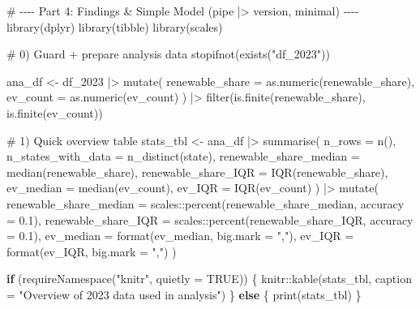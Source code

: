 \documentclass[
  english,
  letterpaper,
  DIV=11,
  numbers=noendperiod]{scrartcl}
\newenvironment{Shaded}{\begin{snugshade}}{\end{snugshade}}
\newcommand{\AttributeTok}[1]{\textcolor[rgb]{0.40,0.45,0.13}{#1}}
\newcommand{\CommentTok}[1]{\textcolor[rgb]{0.37,0.37,0.37}{#1}}
\newcommand{\ConstantTok}[1]{\textcolor[rgb]{0.56,0.35,0.01}{#1}}
\newcommand{\ControlFlowTok}[1]{\textcolor[rgb]{0.00,0.23,0.31}{\textbf{#1}}}
\newcommand{\FloatTok}[1]{\textcolor[rgb]{0.68,0.00,0.00}{#1}}
\newcommand{\FunctionTok}[1]{\textcolor[rgb]{0.28,0.35,0.67}{#1}}
\newcommand{\NormalTok}[1]{\textcolor[rgb]{0.00,0.23,0.31}{#1}}
\newcommand{\OtherTok}[1]{\textcolor[rgb]{0.00,0.23,0.31}{#1}}
\newcommand{\SpecialCharTok}[1]{\textcolor[rgb]{0.37,0.37,0.37}{#1}}
\newcommand{\StringTok}[1]{\textcolor[rgb]{0.13,0.47,0.30}{#1}}
\begin{document}
\begin{Shaded}
\begin{Highlighting}[]
\CommentTok{\# {-}{-}{-}{-} Part 4: Findings \& Simple Model (pipe |\textgreater{} version, minimal) {-}{-}{-}{-}}
\FunctionTok{library}\NormalTok{(dplyr)}
\FunctionTok{library}\NormalTok{(tibble)}
\FunctionTok{library}\NormalTok{(scales)}

\CommentTok{\# 0) Guard + prepare analysis data}
\FunctionTok{stopifnot}\NormalTok{(}\FunctionTok{exists}\NormalTok{(}\StringTok{"df\_2023"}\NormalTok{))}

\NormalTok{ana\_df }\OtherTok{\textless{}{-}}
\NormalTok{  df\_2023 }\SpecialCharTok{|\textgreater{}}
  \FunctionTok{mutate}\NormalTok{(}
    \AttributeTok{renewable\_share =} \FunctionTok{as.numeric}\NormalTok{(renewable\_share),}
    \AttributeTok{ev\_count        =} \FunctionTok{as.numeric}\NormalTok{(ev\_count)}
\NormalTok{  ) }\SpecialCharTok{|\textgreater{}}
  \FunctionTok{filter}\NormalTok{(}\FunctionTok{is.finite}\NormalTok{(renewable\_share), }\FunctionTok{is.finite}\NormalTok{(ev\_count))}

\CommentTok{\# 1) Quick overview table}
\NormalTok{stats\_tbl }\OtherTok{\textless{}{-}}
\NormalTok{  ana\_df }\SpecialCharTok{|\textgreater{}}
  \FunctionTok{summarise}\NormalTok{(}
    \AttributeTok{n\_rows                 =} \FunctionTok{n}\NormalTok{(),}
    \AttributeTok{n\_states\_with\_data     =} \FunctionTok{n\_distinct}\NormalTok{(state),}
    \AttributeTok{renewable\_share\_median =} \FunctionTok{median}\NormalTok{(renewable\_share),}
    \AttributeTok{renewable\_share\_IQR    =} \FunctionTok{IQR}\NormalTok{(renewable\_share),}
    \AttributeTok{ev\_median              =} \FunctionTok{median}\NormalTok{(ev\_count),}
    \AttributeTok{ev\_IQR                 =} \FunctionTok{IQR}\NormalTok{(ev\_count)}
\NormalTok{  ) }\SpecialCharTok{|\textgreater{}}
  \FunctionTok{mutate}\NormalTok{(}
    \AttributeTok{renewable\_share\_median =}\NormalTok{ scales}\SpecialCharTok{::}\FunctionTok{percent}\NormalTok{(renewable\_share\_median, }\AttributeTok{accuracy =} \FloatTok{0.1}\NormalTok{),}
    \AttributeTok{renewable\_share\_IQR    =}\NormalTok{ scales}\SpecialCharTok{::}\FunctionTok{percent}\NormalTok{(renewable\_share\_IQR,    }\AttributeTok{accuracy =} \FloatTok{0.1}\NormalTok{),}
    \AttributeTok{ev\_median              =} \FunctionTok{format}\NormalTok{(ev\_median, }\AttributeTok{big.mark =} \StringTok{","}\NormalTok{),}
    \AttributeTok{ev\_IQR                 =} \FunctionTok{format}\NormalTok{(ev\_IQR,    }\AttributeTok{big.mark =} \StringTok{","}\NormalTok{)}
\NormalTok{  )}

\ControlFlowTok{if}\NormalTok{ (}\FunctionTok{requireNamespace}\NormalTok{(}\StringTok{"knitr"}\NormalTok{, }\AttributeTok{quietly =} \ConstantTok{TRUE}\NormalTok{)) \{}
\NormalTok{  knitr}\SpecialCharTok{::}\FunctionTok{kable}\NormalTok{(stats\_tbl, }\AttributeTok{caption =} \StringTok{"Overview of 2023 data used in analysis"}\NormalTok{)}
\NormalTok{\} }\ControlFlowTok{else}\NormalTok{ \{}
  \FunctionTok{print}\NormalTok{(stats\_tbl)}
\NormalTok{\}}
\end{Highlighting}
\end{Shaded}
\end{document}
